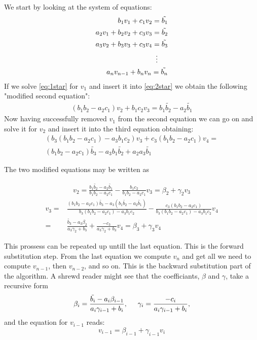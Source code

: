 \documentclass[11pt,a4paper,english,final]{article}
\numberwithin{equation}{section}
\begin{document}
We start by looking at the system of equations:
\begin{align}
	 b_1 v_1 + c_1 v_{2} = \tilde{b_1} \label{eq:1star}\\
	 a_2 v_1 + b_2 v_2 + c_3 v_3 = \tilde{b_2} \label{eq:2star}\\
	 a_3 v_2 + b_3 v_3 + c_3 v_4 = \tilde{b_3} \label{eq:3star}\\
\nonumber\vdots \hspace{0.5cm}  \\ 
	 a_n v_{n-1} + b_n v_n = \tilde{b_n} \label{eq:Nstar}
\end{align}
If we solve \eqref{eq:1star} for $v_1$ and insert it into \eqref{eq:2star} we obtain the following "modified second equation":
\begin{align*}
	(b_1 b_2 - a_2 c_1)v_2 + b_1 c_2 v_3 = b_1 \tilde{b_2} - a_2  \tilde{b_1}  
\end{align*}
Now having successfully removed $v_1$ from the second equation we can go on and solve it for $v_2$ and insert it into the third equation obtaining:
\begin{align*}
(b_3 (b_1 b_2 - a_2 c_1)- a_3 b_1 c_2)v_3 + c_3(b_1 b_2 -a_2 c_1)v_4 = \\
(b_1 b_2 - a_2 c_1 ) \tilde{b_3} - a_3 b_1 \tilde{b_2} + a_2 a_3 \tilde{b_1} 
\end{align*}

The two modified equations may be written as 

\begin{align*}
v_2 = \frac{b_1 \tilde{b_2} - a_2 \tilde{b_1}}{b_1 b_2 - a_2 c_1} - \frac{b_1 c_2}{b_1 b_2 - a_2 c_1} v_3 = \beta_2 + \gamma_2 v_3
\end{align*}
\begin{align*}
v_3 =& \frac{(b_1 b_2 - a_2 c_1) \tilde{b_3} - a_3 (b_1 \tilde{b_2} - a_2 \tilde{b_1})}{b_3 (b_1 b_2 - a_2 c_1)- a_3 b_1 c_2} - \frac{c_3(b_1 b_2 - a_2 c_1)}{b_3 (b_1 b_2 - a_2 c_1)- a_3 b_1 c_2} v_4 \\
=&  \frac{\tilde{b_3}-a_3 \beta_2}{a_3 \gamma_2 + b_3} + \frac{-c_3}{a_3 \gamma_2 + b_3}v_4 = \beta_3 + \gamma_3 v_4
\end{align*}

This prossess can be repeated up untill the last equation. 
This is the forward substitution step. 
From the last equation we compute $v_n$ and get all we need to compute $v_{n-1}$,
then $v_{n-2}$, and so on. This is the backward substitution part of the algorithm. A shrewd reader might see that the coefficiants, $\beta$ and $\gamma$, take a recursive form
\begin{align*}
\beta_{i} = \frac{\tilde{b_i}-a_i \beta_{i-1}}{a_i \gamma_{i-1} + b_i} , \hspace{0.5cm} \gamma_{i}=\frac{-c_i}{a_i \gamma_{i-1} + b_i},
\end{align*}
and the equation for $v_{i-1}$ reads: 
\begin{equation}
v_{i-1} = \beta_{i-1} + \gamma_{i-1} v_i
\label{eq:viminus1}
\end{equation}
\end{document}
